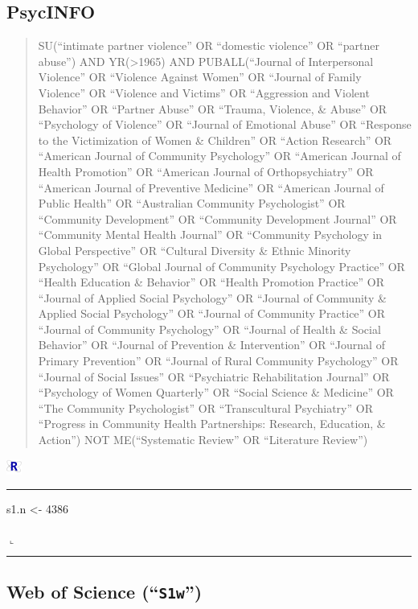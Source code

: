 \documentclass[]{tufte-handout}
\newenvironment{Shaded}{}{}
\newcommand{\DecValTok}[1]{{#1}}
\newcommand{\StringTok}[1]{{#1}}
\newcommand{\NormalTok}[1]{{#1}}
\newcommand{\Rrule}{
    \vspace*{1em}
    \noindent
    \hspace{-1em}
    \includegraphics[width=0.5cm]{auxDocs/Rlogo.png}
    \textcolor{Rblue}{
        \rule[0.1in]{0.90\linewidth}{0.02mm}
    }
    \vspace{-1.35em}
}
\newcommand{\Rerule}{
    \noindent
    \hspace{-1em}
    \textcolor{Rblue}{
        $\llcorner$\rule[-0.4mm]{\linewidth}{0.02mm}
    }
}
\begin{document}
\subsection{PsycINFO}\label{psycinfo}

\begin{quote}
SU(``intimate partner violence'' OR ``domestic violence'' OR ``partner
abuse'') AND YR(\textgreater{}1965) AND PUBALL(``Journal of
Interpersonal Violence'' OR ``Violence Against Women'' OR ``Journal of
Family Violence'' OR ``Violence and Victims'' OR ``Aggression and
Violent Behavior'' OR ``Partner Abuse'' OR ``Trauma, Violence, \&
Abuse'' OR ``Psychology of Violence'' OR ``Journal of Emotional Abuse''
OR ``Response to the Victimization of Women \& Children'' OR ``Action
Research'' OR ``American Journal of Community Psychology'' OR ``American
Journal of Health Promotion'' OR ``American Journal of Orthopsychiatry''
OR ``American Journal of Preventive Medicine'' OR ``American Journal of
Public Health'' OR ``Australian Community Psychologist'' OR ``Community
Development'' OR ``Community Development Journal'' OR ``Community Mental
Health Journal'' OR ``Community Psychology in Global Perspective'' OR
``Cultural Diversity \& Ethnic Minority Psychology'' OR ``Global Journal
of Community Psychology Practice'' OR ``Health Education \& Behavior''
OR ``Health Promotion Practice'' OR ``Journal of Applied Social
Psychology'' OR ``Journal of Community \& Applied Social Psychology'' OR
``Journal of Community Practice'' OR ``Journal of Community Psychology''
OR ``Journal of Health \& Social Behavior'' OR ``Journal of Prevention
\& Intervention'' OR ``Journal of Primary Prevention'' OR ``Journal of
Rural Community Psychology'' OR ``Journal of Social Issues'' OR
``Psychiatric Rehabilitation Journal'' OR ``Psychology of Women
Quarterly'' OR ``Social Science \& Medicine'' OR ``The Community
Psychologist'' OR ``Transcultural Psychiatry'' OR ``Progress in
Community Health Partnerships: Research, Education, \& Action'') NOT
ME(``Systematic Review'' OR ``Literature Review'')
\end{quote}

\Rrule

\begin{Shaded}
\begin{Highlighting}[]
\NormalTok{s1.n <-}\StringTok{ }\DecValTok{4386}
\end{Highlighting}
\end{Shaded}

\Rerule

\subsection{\texorpdfstring{Web of Science
(``\texttt{S1w}'')}{Web of Science (S1w)}}\label{web-of-science-s1w}
\end{document}

